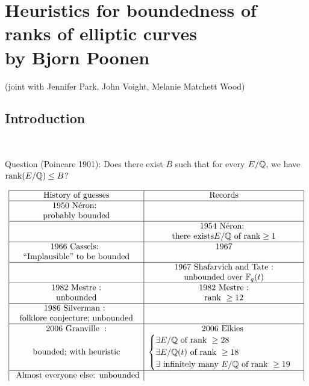 \documentclass[12pt,amsfont]{amsart}
\begin{document}
\newpage
\section{Heuristics for boundedness of ranks of elliptic curves
\\by Bjorn Poonen}\label{20}
\renewcommand{\thesubsection}{\arabic{section}.\arabic{subsection}}

(joint with Jennifer Park, John Voight, Melanie Matchett Wood)
\subsection{Introduction}
{\ }

Question (Poincare 1901): Does there exist $B$ such that for every $E/{\mathbb Q}$, we have $\operatorname{rank}(E/{\mathbb Q}) \leq B$? 

\[ 
\begin{array}{|c|c|} 
\hline
\text{History of guesses} & \text{Records}   \\
\hline
1950 \text{ N\'{e}ron: } &  \\ 
\text{probably bounded} &  \\
\hline
& 1954 \text{ N\'{e}ron: }\\
& \text{there exists} E/{\mathbb Q} \text{ of rank} \geq 1\\
\hline
1966 \text{ Cassels: } & 1967   \\
\text{``Implausible'' to be bounded} &  \\
\hline
& 1967 \text{ Shafarvich and Tate :}  \\
& \text{unbounded over } {\mathbb F}_q(t) \\
\hline
1982 \text{ Mestre :} & 1982 \text{ Mestre :}  \\
\text{unbounded} & \text{rank } \geq 12 \\
\hline
1986 \text{ Silverman : } &  \\
\text{folklore conjecture; unbounded} &  \\
\hline
2006 \text{ Granville }: & 2006 \text{ Elkies }  \\
\text{bounded; with heuristic} 
& \begin{cases} \exists E/{\mathbb Q} \text{ of rank } \geq 28 \\ \exists E/{\mathbb Q}(t) \text{ of rank } \geq 18 \\ \exists \text{ infinitely many } E/{\mathbb Q} \text{ of rank } \geq 19 \end{cases} \\
\hline
\text{ Almost everyone else: unbounded} &\\
\end{array}
\]
\end{document}
